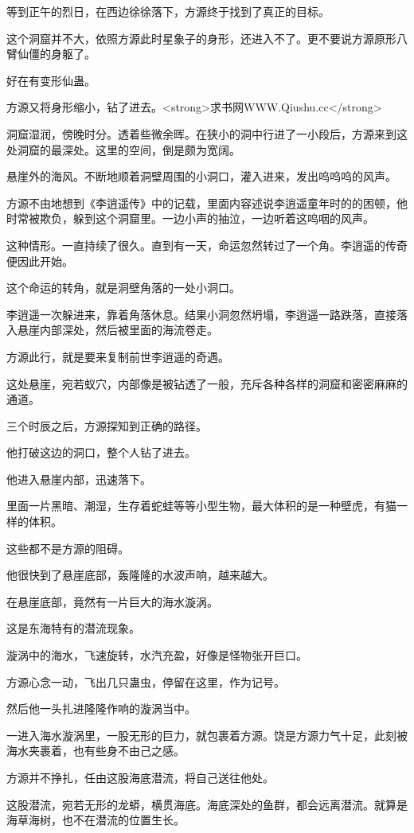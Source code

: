 \begin{this_body}
等到正午的烈日，在西边徐徐落下，方源终于找到了真正的目标。

这个洞窟并不大，依照方源此时星象子的身形，还进入不了。更不要说方源原形八臂仙僵的身躯了。

好在有变形仙蛊。

方源又将身形缩小，钻了进去。<strong>求书网WWW.Qiushu.cc</strong>

洞窟湿润，傍晚时分。透着些微余晖。在狭小的洞中行进了一小段后，方源来到这处洞窟的最深处。这里的空间，倒是颇为宽阔。

悬崖外的海风。不断地顺着洞壁周围的小洞口，灌入进来，发出呜呜呜的风声。

方源不由地想到《李逍遥传》中的记载，里面内容述说李逍遥童年时的的困顿，他时常被欺负，躲到这个洞窟里。一边小声的抽泣，一边听着这呜咽的风声。

这种情形。一直持续了很久。直到有一天，命运忽然转过了一个角。李逍遥的传奇便因此开始。

这个命运的转角，就是洞壁角落的一处小洞口。

李逍遥一次躲进来，靠着角落休息。结果小洞忽然坍塌，李逍遥一路跌落，直接落入悬崖内部深处，然后被里面的海流卷走。

方源此行，就是要来复制前世李逍遥的奇遇。

这处悬崖，宛若蚁穴，内部像是被钻透了一般，充斥各种各样的洞窟和密密麻麻的通道。

三个时辰之后，方源探知到正确的路径。

他打破这边的洞口，整个人钻了进去。

他进入悬崖内部，迅速落下。

里面一片黑暗、潮湿，生存着蛇蛙等等小型生物，最大体积的是一种壁虎，有猫一样的体积。

这些都不是方源的阻碍。

他很快到了悬崖底部，轰隆隆的水波声响，越来越大。

在悬崖底部，竟然有一片巨大的海水漩涡。

这是东海特有的潜流现象。

漩涡中的海水，飞速旋转，水汽充盈，好像是怪物张开巨口。

方源心念一动，飞出几只蛊虫，停留在这里，作为记号。

然后他一头扎进隆隆作响的漩涡当中。

一进入海水漩涡里，一股无形的巨力，就包裹着方源。饶是方源力气十足，此刻被海水夹裹着，也有些身不由己之感。

方源并不挣扎，任由这股海底潜流，将自己送往他处。

这股潜流，宛若无形的龙蟒，横贯海底。海底深处的鱼群，都会远离潜流。就算是海草海树，也不在潜流的位置生长。


\end{this_body}

